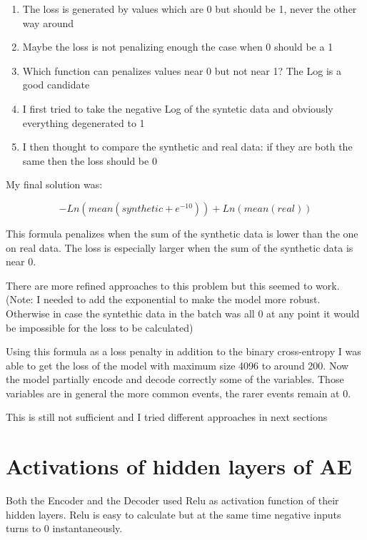 \documentclass[
  letterpaper,
  DIV=11,
  numbers=noendperiod]{scrreprt}
\providecommand{\tightlist}{%
  \setlength{\itemsep}{0pt}\setlength{\parskip}{0pt}}\usepackage{longtable,booktabs,array}
\begin{document}
\begin{enumerate}
\def\labelenumi{\arabic{enumi}.}
\tightlist
\item
  The loss is generated by values which are 0 but should be 1, never the
  other way around
\item
  Maybe the loss is not penalizing enough the case when 0 should be a 1
\item
  Which function can penalizes values near 0 but not near 1? The Log is
  a good candidate
\item
  I first tried to take the negative Log of the syntetic data and
  obviously everything degenerated to 1
\item
  I then thought to compare the synthetic and real data: if they are
  both the same then the loss should be 0
\end{enumerate}

My final solution was:

\[
- Ln(mean(synthetic + e^{-10})) + Ln(mean(real))
\]

This formula penalizes when the sum of the synthetic data is lower than
the one on real data. The loss is especially larger when the sum of the
synthetic data is near 0.

There are more refined approaches to this problem but this seemed to
work.\\
(Note: I needed to add the exponential to make the model more robust.
Otherwise in case the syntethic data in the batch was all 0 at any point
it would be impossible for the loss to be calculated)

Using this formula as a loss penalty in addition to the binary
cross-entropy I was able to get the loss of the model with maximum size
4096 to around 200. Now the model partially encode and decode correctly
some of the variables. Those variables are in general the more common
events, the rarer events remain at 0.

This is still not sufficient and I tried different approaches in next
sections

\hypertarget{activations-of-hidden-layers-of-ae}{%
\chapter{Activations of hidden layers of
AE}\label{activations-of-hidden-layers-of-ae}}

Both the Encoder and the Decoder used Relu as activation function of
their hidden layers. Relu is easy to calculate but at the same time
negative inputs turns to 0 instantaneously.
\end{document}
